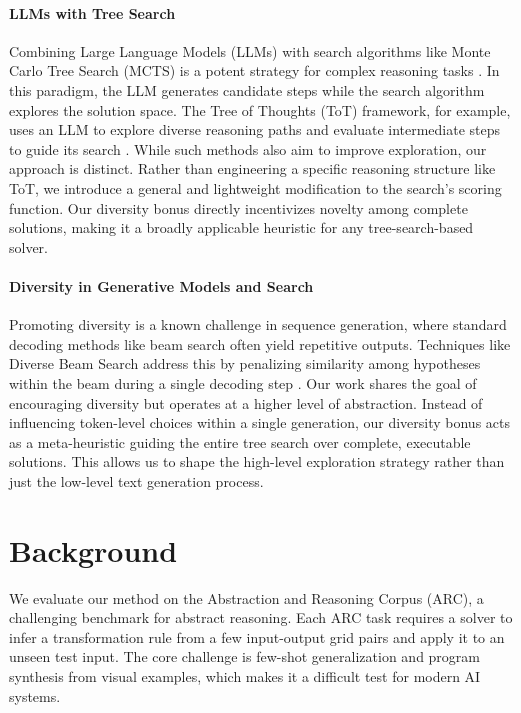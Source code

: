 \documentclass{article} %
\begin{document}
\paragraph{LLMs with Tree Search}
Combining Large Language Models (LLMs) with search algorithms like Monte Carlo Tree Search (MCTS) is a potent strategy for complex reasoning tasks \citep{abmcts}. In this paradigm, the LLM generates candidate steps while the search algorithm explores the solution space. The Tree of Thoughts (ToT) framework, for example, uses an LLM to explore diverse reasoning paths and evaluate intermediate steps to guide its search \citep{Yao2023TreeOT}. While such methods also aim to improve exploration, our approach is distinct. Rather than engineering a specific reasoning structure like ToT, we introduce a general and lightweight modification to the search's scoring function. Our diversity bonus directly incentivizes novelty among complete solutions, making it a broadly applicable heuristic for any tree-search-based solver.

\paragraph{Diversity in Generative Models and Search}
Promoting diversity is a known challenge in sequence generation, where standard decoding methods like beam search often yield repetitive outputs. Techniques like Diverse Beam Search address this by penalizing similarity among hypotheses within the beam during a single decoding step \citep{Vijayakumar2016DiverseBS}. Our work shares the goal of encouraging diversity but operates at a higher level of abstraction. Instead of influencing token-level choices within a single generation, our diversity bonus acts as a meta-heuristic guiding the entire tree search over complete, executable solutions. This allows us to shape the high-level exploration strategy rather than just the low-level text generation process.

\section{Background}
\label{sec:background}
We evaluate our method on the Abstraction and Reasoning Corpus (ARC), a challenging benchmark for abstract reasoning. Each ARC task requires a solver to infer a transformation rule from a few input-output grid pairs and apply it to an unseen test input. The core challenge is few-shot generalization and program synthesis from visual examples, which makes it a difficult test for modern AI systems.
\end{document}
